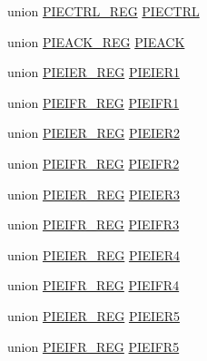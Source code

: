 \begin{DoxyCompactItemize}
\item 
union \hyperlink{union_p_i_e_c_t_r_l___r_e_g}{P\+I\+E\+C\+T\+R\+L\+\_\+\+R\+E\+G} \hyperlink{struct_p_i_e___c_t_r_l___r_e_g_s_a3a9284d54b54f023cfc9346bc469b28b}{P\+I\+E\+C\+T\+R\+L}
\item 
union \hyperlink{union_p_i_e_a_c_k___r_e_g}{P\+I\+E\+A\+C\+K\+\_\+\+R\+E\+G} \hyperlink{struct_p_i_e___c_t_r_l___r_e_g_s_a1bfa5d4e282b598ea2da9ce64af8b94d}{P\+I\+E\+A\+C\+K}
\item 
union \hyperlink{union_p_i_e_i_e_r___r_e_g}{P\+I\+E\+I\+E\+R\+\_\+\+R\+E\+G} \hyperlink{struct_p_i_e___c_t_r_l___r_e_g_s_a948073a031fe220b40d68ca311c67dd8}{P\+I\+E\+I\+E\+R1}
\item 
union \hyperlink{union_p_i_e_i_f_r___r_e_g}{P\+I\+E\+I\+F\+R\+\_\+\+R\+E\+G} \hyperlink{struct_p_i_e___c_t_r_l___r_e_g_s_a40ed0829306f50b2149bff202bafa5d9}{P\+I\+E\+I\+F\+R1}
\item 
union \hyperlink{union_p_i_e_i_e_r___r_e_g}{P\+I\+E\+I\+E\+R\+\_\+\+R\+E\+G} \hyperlink{struct_p_i_e___c_t_r_l___r_e_g_s_a179f3ca801f2c5849c9cf554b4663812}{P\+I\+E\+I\+E\+R2}
\item 
union \hyperlink{union_p_i_e_i_f_r___r_e_g}{P\+I\+E\+I\+F\+R\+\_\+\+R\+E\+G} \hyperlink{struct_p_i_e___c_t_r_l___r_e_g_s_aec660c51175eecd1fd33cb5c98e0f0d3}{P\+I\+E\+I\+F\+R2}
\item 
union \hyperlink{union_p_i_e_i_e_r___r_e_g}{P\+I\+E\+I\+E\+R\+\_\+\+R\+E\+G} \hyperlink{struct_p_i_e___c_t_r_l___r_e_g_s_acdd42f7a109d22a3522d813e3e00970b}{P\+I\+E\+I\+E\+R3}
\item 
union \hyperlink{union_p_i_e_i_f_r___r_e_g}{P\+I\+E\+I\+F\+R\+\_\+\+R\+E\+G} \hyperlink{struct_p_i_e___c_t_r_l___r_e_g_s_a5763f79057592a1e6826102115bdf4b8}{P\+I\+E\+I\+F\+R3}
\item 
union \hyperlink{union_p_i_e_i_e_r___r_e_g}{P\+I\+E\+I\+E\+R\+\_\+\+R\+E\+G} \hyperlink{struct_p_i_e___c_t_r_l___r_e_g_s_a6434d2406c71aa95b14d5e0c5f5113aa}{P\+I\+E\+I\+E\+R4}
\item 
union \hyperlink{union_p_i_e_i_f_r___r_e_g}{P\+I\+E\+I\+F\+R\+\_\+\+R\+E\+G} \hyperlink{struct_p_i_e___c_t_r_l___r_e_g_s_a8b9ed3086ccf2057688ce9a8503c1581}{P\+I\+E\+I\+F\+R4}
\item 
union \hyperlink{union_p_i_e_i_e_r___r_e_g}{P\+I\+E\+I\+E\+R\+\_\+\+R\+E\+G} \hyperlink{struct_p_i_e___c_t_r_l___r_e_g_s_a2843affe4959a7bc70467b0d54e18f64}{P\+I\+E\+I\+E\+R5}
\item 
union \hyperlink{union_p_i_e_i_f_r___r_e_g}{P\+I\+E\+I\+F\+R\+\_\+\+R\+E\+G} \hyperlink{struct_p_i_e___c_t_r_l___r_e_g_s_ad2915f92b53611ab3e0405f198d89b78}{P\+I\+E\+I\+F\+R5}

\end{DoxyCompactItemize}
